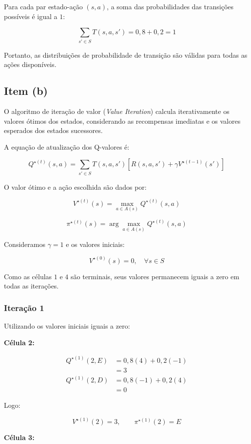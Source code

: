 Para cada par estado-ação $(s,a)$,
a soma das probabilidades das transições
possíveis é igual a $1$:

\[
    \sum_{s'\in S}T(s,a,s')
    = 0{,}8 + 0{,}2 = 1
\]

Portanto, as distribuições de probabilidade
de transição são válidas para todas
as ações disponíveis.


\subsection{Item (b)}

O algoritmo de iteração de valor (\textit{Value Iteration})
calcula iterativamente os valores ótimos dos estados,
considerando as recompensas imediatas e os valores
esperados dos estados sucessores.

A equação de atualização dos Q-valores é:

\[
Q^{\star(t)}(s,a) =
\sum_{s'\in S} T(s,a,s')
\left[R(s,a,s')+\gamma V^{\star(t-1)}(s')\right]
\]

O valor ótimo e a ação escolhida são dados por:

\[
V^{\star(t)}(s) = \max_{a\in A(s)}Q^{\star(t)}(s,a)
\]

\[
\pi^{\star(t)}(s) =
\arg\max_{a\in A(s)}Q^{\star(t)}(s,a)
\]

Consideramos $\gamma=1$ e os valores iniciais:

\[
V^{\star(0)}(s)=0,\quad \forall s\in S
\]

Como as células $1$ e $4$ são terminais,
seus valores permanecem iguais a zero
em todas as iterações.

\subsubsection*{Iteração 1}

Utilizando os valores iniciais iguais a zero:

\textbf{Célula 2:}

\[
\begin{aligned}
Q^{\star(1)}(2,E)
&=0{,}8(4)+0{,}2(-1)\\
&=3
\\[6pt]
Q^{\star(1)}(2,D)
&=0{,}8(-1)+0{,}2(4)\\
&=0
\end{aligned}
\]

Logo:

\[
V^{\star(1)}(2)=3,
\qquad \pi^{\star(1)}(2)=E
\]

\textbf{Célula 3:}

